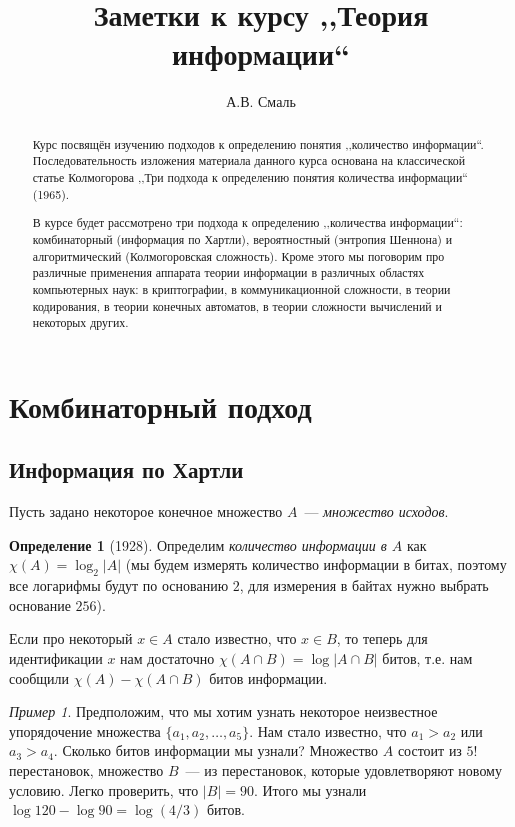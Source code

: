\documentclass[12pt]{article}
\title{Заметки к курсу ,,Теория информации``}
\author{А.В. Смаль}
\newcommand{\seqn}[2]{{#1}_1,{#1}_2,\dotsc,{#1}_{#2}}
\theoremstyle{definition}
\newtheorem{definition}{Определение}[section]
\theoremstyle{plain}
\theoremstyle{remark}
\newtheorem{example}{Пример}[section]
\begin{document}
\maketitle

\begin{abstract}
Курс посвящён изучению подходов к определению понятия  ,,количество информации``. 
Последовательность изложения материала данного курса основана на классической статье Колмогорова ,,Три подхода к
определению понятия количества информации`` (1965).

В курсе будет рассмотрено три подхода к определению ,,количества информации``: 
комбинаторный (информация по Хартли), вероятностный (энтропия Шеннона) и 
алгоритмический (Колмогоровская сложность). Кроме этого мы поговорим про
различные применения аппарата теории информации в различных областях компьютерных наук:
в криптографии, в коммуникационной сложности, в теории кодирования, 
в теории конечных автоматов, в теории сложности вычислений и некоторых других.
\end{abstract}

\newpage\tableofcontents\newpage

\section{Комбинаторный подход}
\subsection{Информация по Хартли}
Пусть задано некоторое конечное множество \(A\)~--- \emph{множество исходов}.
\begin{definition}[1928]
Определим \emph{количество информации в \(A\)} как \(\chi(A) = \log_2|A|\) (мы будем измерять количество информации в битах, поэтому все логарифмы будут по основанию \(2\), для измерения в байтах нужно выбрать основание \(256\)).
\end{definition}

Если про некоторый \(x\in A\) стало известно, что \(x\in B\), то теперь для идентификации \(x\) нам достаточно \(\chi(A\cap B) = \log |A\cap B|\) битов, т.е. нам сообщили \(\chi(A) - \chi(A\cap B)\) битов информации.

\begin{example}
    Предположим, что мы хотим узнать некоторое неизвестное упорядочение множества $\{\seqn{a}{5}\}$. Нам стало известно,
    что \(a_1>a_2\) или \(a_3>a_4\). Сколько битов информации мы узнали? Множество \(A\) состоит из \(5!\) перестановок,
    множество \(B\)~--- из перестановок, которые удовлетворяют новому условию. Легко проверить, что \(|B| = 90\). Итого
    мы узнали \(\log 120 - \log 90 = \log(4/3)\) битов.
\end{example}
\end{document}
